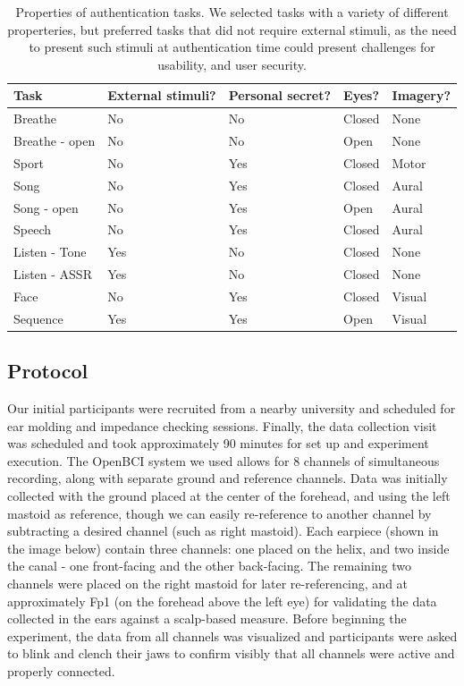 \documentclass[11pt]{article}
\begin{document}
\begin{table}[h]
\centering
\begin{tabular}{lllll}
Task & External stimuli? & Personal secret? & Eyes? & Imagery?\\
\hline
Breathe & No & No & Closed & None\\
Breathe - open & No & No & Open & None\\
Sport & No & Yes & Closed & Motor\\
Song & No & Yes & Closed & Aural\\
Song - open & No & Yes & Open & Aural\\
Speech & No & Yes & Closed & Aural\\
Listen - Tone & Yes & No & Closed & None\\
Listen - ASSR & Yes & No & Closed & None\\
Face & No & Yes & Closed & Visual\\
Sequence & Yes & Yes & Open & Visual\\
\hline
\end{tabular}
\caption{Properties of authentication tasks. We selected tasks with a variety of different properteries, but preferred tasks that did not require external stimuli, as the need to present such stimuli at authentication time could present challenges for usability, and user security.}
\end{table}
\subsection{Protocol}
\label{sec:org2041857}
Our initial participants were recruited from a nearby university and scheduled for ear molding
and impedance checking sessions. Finally, the data collection visit was scheduled and took
approximately 90 minutes for set up and experiment execution. The OpenBCI system we used
allows for 8 channels of simultaneous recording, along with separate ground and reference channels.
Data was initially collected with the ground placed at the center of the forehead, and using the left
mastoid as reference, though we can easily re-reference to another channel by subtracting a desired
channel (such as right mastoid). Each earpiece (shown in the image below) contain three channels: 
one placed on the helix, and two inside the canal - one front-facing and the other back-facing. The remaining
two channels were placed on the right mastoid for later re-referencing, and at approximately Fp1 (on the 
forehead above the left eye) for validating the data collected in the ears against a scalp-based measure. 
Before beginning the experiment, the data from all channels was visualized and participants were asked to
blink and clench their jaws to confirm visibly that all channels were active and properly connected.
\end{document}
